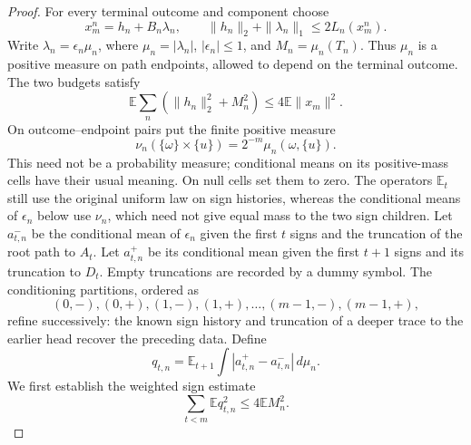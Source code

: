 \begin{proof}
For every terminal outcome and component choose
\[
 x_m^n=h_n+B_n\lambda_n,
 \qquad \|h_n\|_2+\|\lambda_n\|_1\le2L_n(x_m^n).
\]
Write \(\lambda_n=\epsilon_n\mu_n\), where \(\mu_n=|\lambda_n|\),
\(|\epsilon_n|\le1\), and \(M_n=\mu_n(T_n)\).  Thus \(\mu_n\) is a
positive measure on path endpoints, allowed to depend on the terminal
outcome.  The two budgets satisfy
\begin{equation}\label{eq:linear-sign-budgets}
 \mathbb E\sum_n(\|h_n\|_2^2+M_n^2)\le4\mathbb E\|x_m\|^2.
\end{equation}
On outcome--endpoint pairs put the finite positive measure
\[
 \nu_n(\{\omega\}\times\{u\})=2^{-m}\mu_n(\omega,\{u\}).
\]
This need not be a probability measure; conditional means on its
positive-mass cells have their usual meaning. On null cells set them
to zero. The operators \(\mathbb E_t\) still use the original uniform
law on sign histories, whereas the conditional means of \(\epsilon_n\)
below use \(\nu_n\), which need not give equal mass to the two sign
children. Let \(a_{t,n}^-\) be the conditional mean of \(\epsilon_n\)
given the first \(t\) signs and the truncation of the root path to
\(A_t\).  Let \(a_{t,n}^+\) be its conditional mean given the first
\(t+1\) signs and its truncation to \(D_t\).  Empty truncations are
recorded by a dummy symbol.  The conditioning partitions, ordered as
\[
 (0,-),(0,+),(1,-),(1,+),\ldots,(m-1,-),(m-1,+),
\]
refine successively: the known sign history and truncation of a deeper
trace to the earlier head recover the preceding data. Define
\[
 q_{t,n}=\mathbb E_{t+1}
       \int|a_{t,n}^+-a_{t,n}^-|\,d\mu_n.
\]
We first establish the weighted sign estimate
\begin{equation}\label{eq:linear-weighted-sign}
 \sum_{t<m}\mathbb E q_{t,n}^2\le4\mathbb E M_n^2.
\end{equation}


\end{proof}
